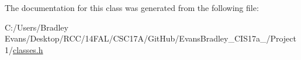 The documentation for this class was generated from the following file\+:\begin{DoxyCompactItemize}
\item 
C\+:/\+Users/\+Bradley Evans/\+Desktop/\+R\+C\+C/14\+F\+A\+L/\+C\+S\+C17\+A/\+Git\+Hub/\+Evans\+Bradley\+\_\+\+C\+I\+S17a\+\_/\+Project 1/\hyperlink{classes_8h}{classes.\+h}\end{DoxyCompactItemize}
